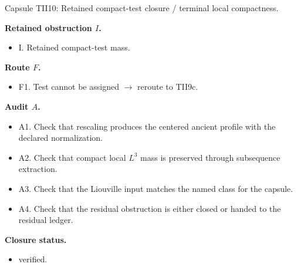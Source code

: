 \documentclass[11pt]{amsart}
\newcommand{\capsulefield}[1]{\par\smallskip\noindent\textbf{#1.}\ }
\begin{document}
\begin{proofcapsule}{Capsule TII10: Retained compact-test closure / terminal local compactness.}
  \capsulefield{Retained obstruction \(I\)}
  \begin{itemize}[leftmargin=1.8em]
  \item I. Retained compact-test mass.
  \end{itemize}

  \capsulefield{Route \(F\)}
  \begin{itemize}[leftmargin=1.8em]
  \item F1. Test cannot be assigned $\to$ reroute to TII9c.
  \end{itemize}

  \capsulefield{Audit \(A\)}
  \begin{itemize}[leftmargin=1.8em]
  \item A1. Check that rescaling produces the centered ancient profile with the declared normalization.
  \item A2. Check that compact local $L^3$ mass is preserved through subsequence extraction.
  \item A3. Check that the Liouville input matches the named class for the capsule.
  \item A4. Check that the residual obstruction is either closed or handed to the residual ledger.
  \end{itemize}
  \capsulefield{Closure status}
  \begin{itemize}[leftmargin=1.8em]
  \item verified.
  \end{itemize}
\end{proofcapsule}
\end{document}
